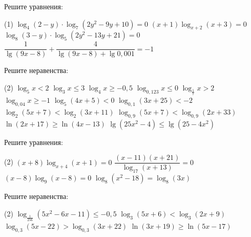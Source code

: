 \begin{class}[number=6]
	\begin{listofex}
		\item Решите уравнения: %
		\begin{tasks}(1)
			\task \( \log_4 (2-y) \cdot \log_7 (2y^2-9y+10) = 0 \)
			\task \( (x+1)\log_{x+2}(x+3)=0 \)
			\task \( \log_8 (3-y) \cdot \log_5 (2y^2-13y+21)=0 \)
			\task \( \dfrac{ 1 }{ \lg (9x-8) } + \dfrac{ 4 }{ \lg (9x-8) + \lg 0,001 } = -1 \)
		\end{tasks}
		\item Решите неравенства: %
		\begin{tasks}(2)
			\task \( \log_5 x<2 \)
			\task \( \log_3 x \le 3 \)
			\task \( \log_4 x \ge -0,5 \)
			\task \( \log_{0,123} x \le 0 \)
			\task \( \log_{\tfrac{1}{7}}x>2 \)
			\task \( \log_{0,04}x \ge -1 \)
			\task \( \log_5 (4x+5) < 0 \)
			\task \( \log_{0,1} (3x+25) < -2 \)
			\task \( \log_2(5x+7) < \log_2 (3x+11) \)
			\task \( \log_{0,9}(5x+7) < \log_{0,9} (2x+33) \)
			\task \( \ln(2x+17) \ge \ln(4x-13) \)
			\task \( \lg(25x^2-4) \le \lg(25-4x^2) \)
		\end{tasks}
	\end{listofex}
\end{class}

\begin{homework}[number=3]
	\begin{listofex}
		\item Решите уравнения: %
		\begin{tasks}(2)
			\task \( (x+8)\log_{x+4}(x+1)=0 \)
			\task \( \dfrac{ (x-11)(x+21) }{ \log_{17}(x+13) }=0 \)
			\task \( (x-8)\log_9(x-8)=0 \)
			\task \( \log_8(x^2-18)=\log_8(3x) \)
		\end{tasks}
		\item Решите неравенства: %
		\begin{tasks}(2)
			\task \( \log_{\tfrac{1}{256}}(5x^2-6x-11) \le -0,5 \)
			\task \( \log_3 (5x+6) < \log_3 (2x+9) \)
			\task \( \log_{0,3}(5x-22) > \log_{0,3}(3x+22) \)
			\task \( \ln(3x+19)\ge \ln(5x-17) \)
		\end{tasks}
	\end{listofex}
\end{homework}

